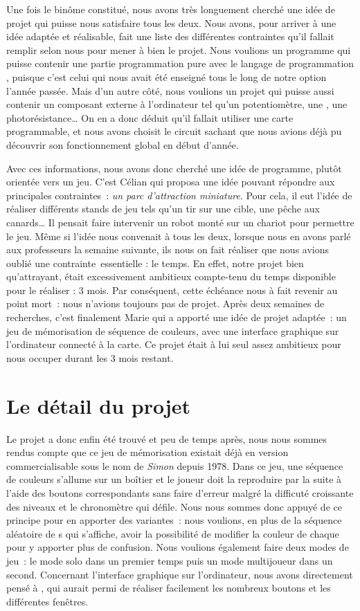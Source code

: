 \documentclass[a4paper, 11pt]{article}
\newcommand{\py}{\sf{Python}}
\newcommand{\pygtk}{\sf{pyGTK}}
\newcommand{\nomcarte}{\sf{Adafruit CircuitPython}}
\newcommand{\led}{\sc{led}}
\begin{document}
Une fois le binôme constitué, nous avons très longuement cherché une idée de projet qui puisse nous satisfaire tous les deux. Nous avons, pour arriver à une idée adaptée et réalisable, fait une liste des différentes contraintes qu'il fallait remplir selon nous pour mener à bien le projet. Nous voulions un programme qui puisse contenir une partie programmation pure avec le langage de programmation \py{}, puisque c'est celui qui nous avait été enseigné tous le long de notre option l'année passée. Mais d'un autre côté, nous voulions un projet qui puisse aussi contenir un composant externe à l'ordinateur tel qu'un potentiomètre, une \led{}, une photorésistance\ldots{} On en a donc déduit qu'il fallait utiliser une carte programmable, et nous avons choisit le circuit \nomcarte{} sachant que nous avions déjà pu découvrir son fonctionnement global en début d'année.

Avec ces informations, nous avons donc cherché une idée de programme, plutôt orientée vers un jeu. C'est Célian qui proposa une idée pouvant répondre aux principales contraintes : \emph{un parc d'attraction miniature}. Pour cela, il eut l'idée de réaliser différents stands de jeu tels qu'un tir sur une cible, une pêche aux canards\ldots{} Il pensait faire intervenir un robot monté sur un chariot pour permettre le jeu. Même si l'idée nous convenait à tous les deux, lorsque nous en avons parlé aux professeurs la semaine suivante, ils nous on fait réaliser que nous avions oublié une contrainte essentielle : le temps. En effet, notre projet bien qu'attrayant, était excessivement ambitieux compte-tenu du temps disponible pour le réaliser : 3 mois. Par conséquent, cette échéance nous à fait revenir au point mort : nous n'avions toujours pas de projet. Après deux semaines de recherches, c'est finalement Marie qui a apporté une idée de projet adaptée : un jeu de mémorisation de séquence de couleurs, avec une interface graphique sur l'ordinateur connecté à la carte. Ce projet était à lui seul assez ambitieux pour nous occuper durant les 3 mois restant.

\section*{Le détail du projet}

Le projet a donc enfin été trouvé et peu de temps après, nous nous sommes rendus compte que ce jeu de mémorisation existait déjà en version commercialisable sous le nom de \emph{Simon} depuis 1978. Dans ce jeu, une séquence de couleurs s'allume sur un boîtier et le joueur doit la reproduire par la suite à l'aide des boutons correspondants sans faire d'erreur malgré la difficuté croissante des niveaux et le chronomètre qui défile. Nous nous sommes donc appuyé de ce principe pour en apporter des variantes : nous voulions, en plus de la séquence aléatoire de \led{}s qui s'affiche, avoir la possibilité de modifier la couleur de chaque \led{} pour y apporter plus de confusion. Nous voulions également faire deux modes de jeu : le mode solo dans un premier temps puis un mode multijoueur dans un second. Concernant l'interface graphique sur l'ordinateur, nous avons directement pensé à \pygtk{}, qui aurait permi de réaliser facilement les nombreux boutons et les différentes fenêtres.
\end{document}
